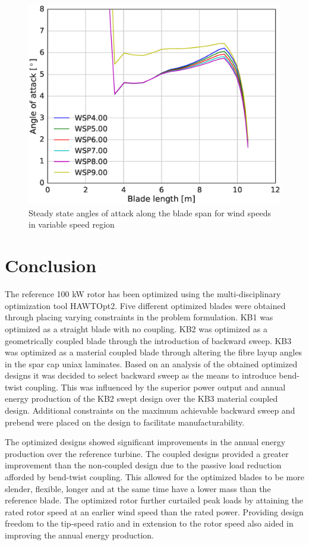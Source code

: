 
\begin{figure}[tph]
\centering
\includegraphics[width=0.8\linewidth]{figures/KB6_final/KB6_AoA_WSP_HS2.eps}
\caption{Steady state angles of attack along the blade span for wind speeds in variable speed region}
\label{fig:KB6_aoa}
\end{figure}

\section{Conclusion}
\label{sec:optimize_conc}
The reference 100 kW rotor has been optimized using the multi-disciplinary optimization tool HAWTOpt2. Five different optimized blades were obtained through placing varying constraints in the problem formulation. KB1 was optimized as a straight blade with no coupling. KB2 was optimized as a geometrically coupled blade through the introduction of backward sweep. KB3 was optimized as a material coupled blade through altering the fibre layup angles in the spar cap uniax laminates. Based on an analysis of the obtained optimized designs it was decided to select backward sweep as the means to introduce bend-twist coupling. This was influenced by the superior power output and annual energy production of the KB2 swept design over the KB3 material coupled design. Additional constraints on the maximum achievable backward sweep and prebend were placed on the design to facilitate manufacturability.  

The optimized designs showed significant improvements in the annual energy production over the reference turbine. The coupled designs provided a greater improvement than the non-coupled design due to the passive load reduction afforded by bend-twist coupling. This allowed for the optimized blades to be more slender, flexible, longer and at the same time have a lower mass than the reference blade. The optimized rotor further curtailed peak loads by attaining the rated rotor speed at an earlier wind speed than the rated power. Providing design freedom to the tip-speed ratio and in extension to the rotor speed also aided in improving the annual energy production.
